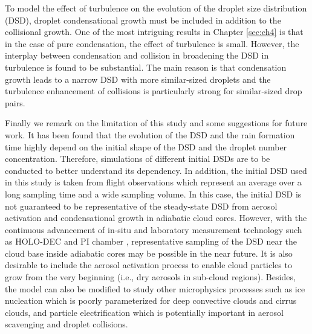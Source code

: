 To model the effect of turbulence on the evolution of the droplet size distribution (DSD), droplet condensational growth must be included in addition to the collisional growth. One of the most intriguing results in Chapter \ref{sec:ch4} is that in the case of pure condensation, the effect of turbulence is small. However, the interplay between condensation and collision in broadening the DSD in turbulence is found to be substantial. The main reason is that condensation growth leads to a narrow DSD with more similar-sized droplets and the turbulence enhancement of collisions is particularly strong for similar-sized drop pairs.

Finally we remark on the limitation of this study and some suggestions for future work. It has been found that the evolution of the DSD and the rain formation time highly depend on the initial shape of the DSD and the droplet number concentration. Therefore, simulations of different initial DSDs are to be conducted to better understand its dependency. In addition, the initial DSD used in this study is taken from flight observations which represent an average over a long sampling time and a wide sampling volume. In this case, the initial DSD is not guaranteed to be representative of the steady-state DSD from aerosol activation and condensational growth in adiabatic cloud cores. However, with the continuous advancement of in-situ and laboratory measurement technology such as HOLO-DEC \citep{GRL2017} and PI chamber \citep{Desai2018}, representative sampling of the DSD near the cloud base inside adiabatic cores may be possible in the near future. It is also desirable to include the aerosol activation process to enable cloud particles to grow from the very beginning (i.e., dry aerosols in sub-cloud regions). Besides, the model can also be modified to study other microphysics processes such as ice nucleation which is poorly parameterized for deep convective clouds and cirrus clouds, and particle electrification which is potentially important in aerosol scavenging and droplet collisions.  

\cleardoublepage 
